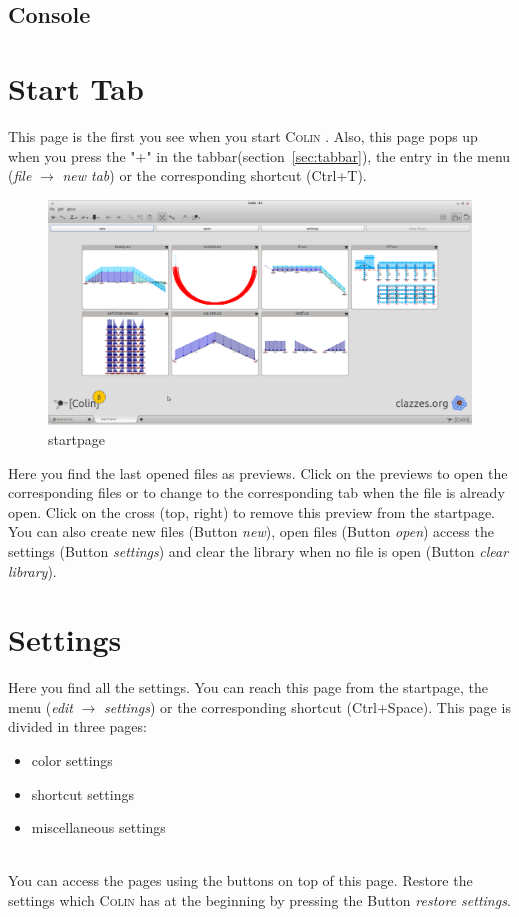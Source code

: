 \documentclass[a4paper,11pt]{report}
\newcommand{\Colin}[0]{\textsc{Colin }}
\begin{document}
\subsection{Console}
\label{ssec:console}


\section{Start Tab}
\label{sec:starttab}

This page is the first you see when you start \Colin. Also, this page pops up when you press the "+" in the tabbar(section~\ref{sec:tabbar}), the entry in the menu (\textit{file} $\rightarrow$ \textit{new tab}) or the corresponding shortcut (Ctrl+T). 
\begin{figure}[H]
\includegraphics[width=\textwidth]{./pictures/startpage.png}
\caption{startpage}
\label{pic:startpage}
\end{figure}
Here you find the last opened files as previews. Click on the previews to open the corresponding files or to change to the corresponding tab when the file is already open. Click on the cross (top, right) to remove this preview from the startpage. You can also create new files (Button \textit{new}), open files (Button \textit{open}) access the settings (Button \textit{settings}) and clear the library when no file is open (Button \textit{clear library}).

\section{Settings}
\label{sec:settings}
Here you find all the settings. You can reach this page from the startpage, the menu (\textit{edit} $\rightarrow$ \textit{settings}) or the corresponding shortcut (Ctrl+Space). This page is divided in three pages:
\begin{itemize}
	\item color settings
	\item shortcut settings
	\item miscellaneous settings
\end{itemize}\\
You can access the pages using the buttons on top of this page. Restore the settings which \Colin has at the beginning by pressing the Button \textit{restore settings}. 
\end{document}
